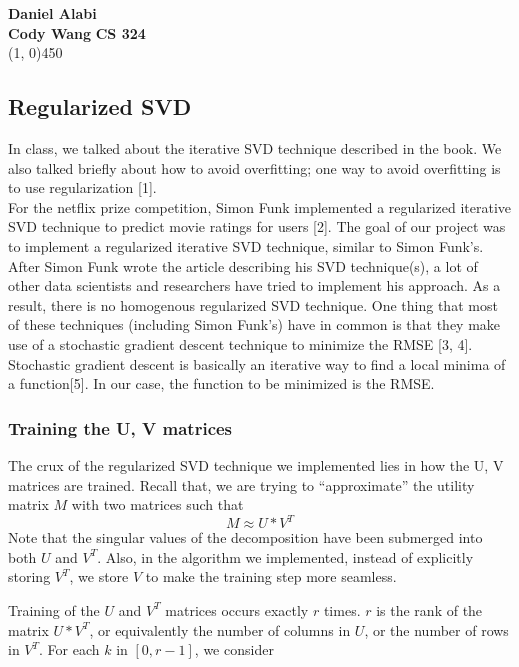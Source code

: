 \documentclass[12pt]{article}
\begin{document}
\noindent \textbf{Daniel Alabi} \\
\textbf{Cody Wang}
\hfill
\textbf{CS 324}\\
\line(1, 0){450} 

\subsection*{Regularized SVD}

In class, we talked about the iterative SVD technique described in the book.
We also talked briefly about how to avoid overfitting; one way to avoid
overfitting is to use regularization [1]. \\

\noindent For the netflix prize competition, Simon Funk implemented a regularized 
iterative SVD technique to predict movie ratings for users [2]. The goal of our
project was to implement a regularized iterative SVD technique, similar
to Simon Funk's. After Simon Funk wrote the article describing his
SVD technique(s), a lot of other data scientists and researchers
have tried to implement his approach. As a result, there is no homogenous
regularized SVD technique. One thing that most of these techniques (including
Simon Funk's) have in common is that they make use of a stochastic 
gradient descent technique to minimize the RMSE [3, 4]. Stochastic gradient 
descent is basically an iterative way to find a local minima of a 
function[5]. In our case, the function to be minimized is the RMSE.

\subsubsection*{Training the U, V matrices}

The crux of the regularized SVD technique we implemented lies in how
the U, V matrices are trained. Recall that, we are trying to ``approximate''
the utility matrix $M$ with two matrices such that
\begin{equation*}
  M \approx U * V^T
\end{equation*}
Note that the singular values of the decomposition have been submerged into
both $U$ and $V^T$. Also, in the algorithm we implemented, instead of 
explicitly storing $V^T$, we store $V$ to make the training step more
seamless.

Training of the $U$ and $V^T$ matrices occurs exactly $r$ times. $r$ is the
rank of the matrix $U*V^T$, or equivalently the number of columns in
$U$, or the number of rows in $V^T$. For each $k$ in $[0, r-1]$, we
consider 
\end{document}
